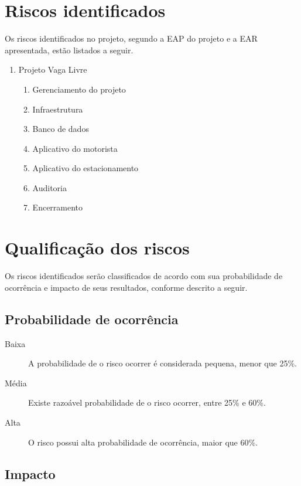 \section{Riscos identificados}

Os riscos identificados no projeto, segundo a EAP do projeto e a EAR apresentada, estão listados a seguir.

\begin{enumerate}
\item Projeto Vaga Livre
\begin{enumerate}
\item Gerenciamento do projeto
\item Infraestrutura
\item Banco de dados
\item Aplicativo do motorista
\item Aplicativo do estacionamento
\item Auditoria
\item Encerramento
\end{enumerate}
\end{enumerate}

\section{Qualificação dos riscos}

Os riscos identificados serão classificados de acordo com sua probabilidade de ocorrência e impacto de seus resultados, conforme descrito a seguir.

\subsection{Probabilidade de ocorrência}

\begin{description}
\item [Baixa] A probabilidade de o risco ocorrer é considerada pequena, menor que 25\%.
\item [Média] Existe razoável probabilidade de o risco ocorrer, entre 25\% e 60\%.
\item [Alta] O risco possui alta probabilidade de ocorrência, maior que 60\%. 
\end{description}

\subsection{Impacto}

